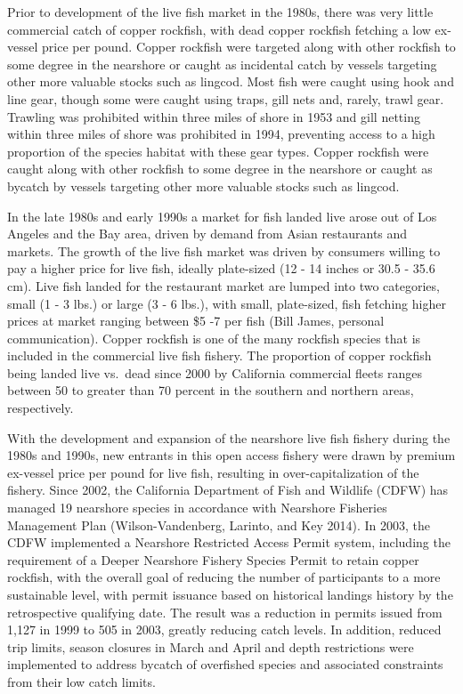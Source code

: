 \documentclass[11pt,
  english,
  letterpaper,
]{article}
\begin{document}
Prior to development of the live fish market in the 1980s, there was very little commercial catch of copper rockfish, with dead copper rockfish fetching a low ex-vessel price per pound. Copper rockfish were targeted along with other rockfish to some degree in the nearshore or caught as incidental catch by vessels targeting other more valuable stocks such as lingcod. Most fish were caught using hook and line gear, though some were caught using traps, gill nets and, rarely, trawl gear. Trawling was prohibited within three miles of shore in 1953 and gill netting within three miles of shore was prohibited in 1994, preventing access to a high proportion of the species habitat with these gear types. Copper rockfish were caught along with other rockfish to some degree in the nearshore or caught as bycatch by vessels targeting other more valuable stocks such as lingcod.

In the late 1980s and early 1990s a market for fish landed live arose out of Los Angeles and the Bay area, driven by demand from Asian restaurants and markets. The growth of the live fish market was driven by consumers willing to pay a higher price for live fish, ideally plate-sized (12 - 14 inches or 30.5 - 35.6 cm). Live fish landed for the restaurant market are lumped into two categories, small (1 - 3 lbs.) or large (3 - 6 lbs.), with small, plate-sized, fish fetching higher prices at market ranging between \$5 -7 per fish (Bill James, personal communication). Copper rockfish is one of the many rockfish species that is included in the commercial live fish fishery. The proportion of copper rockfish being landed live vs.~dead since 2000 by California commercial fleets ranges between 50 to greater than 70 percent in the southern and northern areas, respectively.

With the development and expansion of the nearshore live fish fishery during the 1980s and 1990s, new entrants in this open access fishery were drawn by premium ex-vessel price per pound for live fish, resulting in over-capitalization of the fishery. Since 2002, the California Department of Fish and Wildlife (CDFW) has managed 19 nearshore species in accordance with Nearshore Fisheries Management Plan (Wilson-Vandenberg, Larinto, and Key 2014). In 2003, the CDFW implemented a Nearshore Restricted Access Permit system, including the requirement of a Deeper Nearshore Fishery Species Permit to retain copper rockfish, with the overall goal of reducing the number of participants to a more sustainable level, with permit issuance based on historical landings history by the retrospective qualifying date. The result was a reduction in permits issued from 1,127 in 1999 to 505 in 2003, greatly reducing catch levels. In addition, reduced trip limits, season closures in March and April and depth restrictions were implemented to address bycatch of overfished species and associated constraints from their low catch limits.
\end{document}
